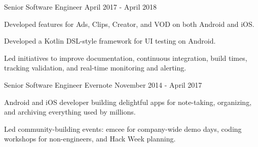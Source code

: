 \begin{cventries}
  \cventry
    {Senior Software Engineer} %
    {} %
    {} %
    {April 2017 - April 2018} %
    {
	\begin{cvitems} %
      	\item Developed features for Ads, Clips, Creator, and VOD on both Android and iOS.
      	\item Developed a Kotlin DSL-style framework for UI testing on Android. 
      	\item Led initiatives to improve documentation, continuous integration, build times, tracking validation, and real-time monitoring and alerting.
	\end{cvitems}
    }

  \cventry
    {Senior Software Engineer} %
    {Evernote} %
    {} %
    {November 2014 - April 2017} %
    {
	\begin{cvitems} %
		\item Android and iOS developer building delightful apps for note-taking, organizing, and archiving everything used by millions.
		\item {Led community-building events: emcee for company-wide demo days, coding workshops for non-engineers, and Hack Week planning.}
	\end{cvitems}
    }
    

\end{cventries}
